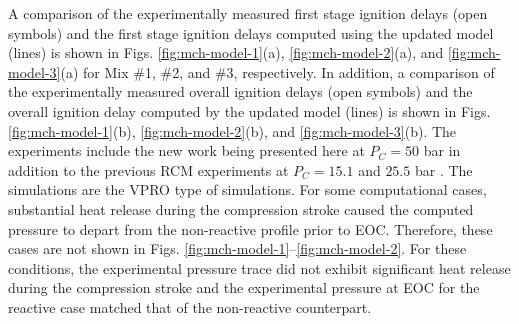 \documentclass[12pt, letterpaper]{article}
\begin{document}
A comparison of the experimentally measured first stage ignition delays (open 
symbols) and the first stage ignition delays computed using the updated model 
(lines) is shown in Figs. \ref{fig:mch-model-1}(a), \ref{fig:mch-model-2}(a), 
and \ref{fig:mch-model-3}(a) for Mix \#1, \#2, and \#3, respectively. In 
addition, a comparison of the experimentally measured overall ignition delays 
(open symbols) and the overall ignition delay computed by the updated model 
(lines) is shown in Figs. \ref{fig:mch-model-1}(b), \ref{fig:mch-model-2}(b), 
and \ref{fig:mch-model-3}(b). The experiments include the new work being 
presented here at $P_C=50$ bar in addition to the previous RCM experiments at 
$P_C=15.1$ and $25.5$ bar \cite{Mittal2009}. The simulations are the VPRO type 
of simulations. For some computational cases, substantial heat release during 
the compression stroke caused the computed pressure to depart from the 
non-reactive profile prior to EOC. Therefore, these cases are not shown in 
Figs. \ref{fig:mch-model-1}--\ref{fig:mch-model-2}. For these conditions, the 
experimental pressure trace did not exhibit significant heat release during 
the compression stroke and the experimental pressure at EOC for the reactive 
case matched that of the non-reactive counterpart. 
\end{document}

